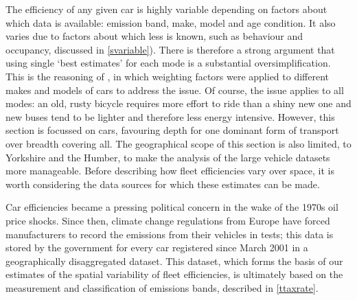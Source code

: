 The efficiency of any given car is highly variable depending on
factors about which data is available: emission band, make,
model and age condition. It also varies due to factors about which
less is known, such as
behaviour and occupancy, discussed in \cref{svariable}). There is therefore a
strong argument that using single `best estimates' for each mode is a
substantial oversimplification.
This is the reasoning of \citet{Leith2007}, in which weighting
factors were applied to different makes and models of cars to address the issue.
Of course,
the issue applies to all modes: an old, rusty bicycle requires more effort
to ride than a shiny new one and new buses tend to be lighter and therefore
less energy intensive. However, this section is focussed on cars, favouring
depth for one dominant form of transport over breadth covering all.
The geographical scope of this section is also limited, to Yorkshire and the
Humber, to make the analysis of the large vehicle datasets more manageable.
Before describing how fleet efficiencies vary over space, it is worth
considering the data sources for which these estimates can be made.


\label{semdata}
Car efficiencies became a pressing political concern in the wake of the 1970s
oil price shocks. Since then, climate change regulations from Europe have
forced manufacturers to record the emissions from their vehicles in tests;
this data is stored by the government for every car registered since March
2001 in a geographically disaggregated dataset. This dataset, which forms the
basis of our estimates of the spatial variability of fleet efficiencies,
is ultimately based on the measurement and classification of emissions bands,
described in \cref{ttaxrate}.

